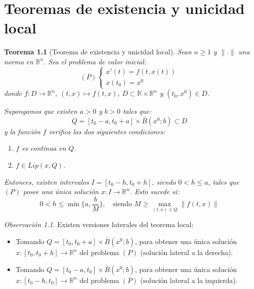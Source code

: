 \documentclass{report}
\newtheorem{theorem}{Teorema}[chapter]
\theoremstyle{remark}
\newtheorem*{remark}{Observación}
\theoremstyle{remark}
\theoremstyle{remark}
\theoremstyle{definition}
\theoremstyle{definition}
\theoremstyle{definition}
\begin{document}
\chapter{Teoremas de existencia y unicidad local}
\begin{theorem}[Teorema de existencia y unicidad local]
    Sean $n \geq 1$ y $\|.\|$ una norma en $\mathbb{R}^n$.
    Sea el problema de valor inicial:
    $$(P) \begin{cases}
            x'(t) = f(t, x(t)) \\
            x(t_0) = x^0
        \end{cases}$$
    donde $f: D \to \mathbb{R}^n$, $(t, x) \mapsto f(t, x)$, $D \subset \mathbb{R} \times \mathbb{R}^n$ y $(t_0, x^0) \in D$.

    Supongamos que existen $a > 0$ y $b > 0$ tales que:
    $$Q = [t_0 - a, t_0 + a] \times \bar{B}(x^0; b) \subset D$$
    y la función $f$ verifica las dos siguientes condiciones:
    \begin{enumerate}
        \item $f$ es continua en $Q$.
        \item $f \in Lip(x, Q)$.
    \end{enumerate}
    Entonces, existen intervalos $I = [t_0 - h, t_0 + h]$, siendo $0 < h \leq a$, tales que $(P)$ posee una única solución $x: I \to \mathbb{R}^n$.
    Esto sucede si:
    $$0 < h \leq \min\{a, \frac{b}{M}\}, \quad \text{siendo } M \geq \max_{(t, x) \in Q} \|f(t, x)\|$$
\end{theorem}

\begin{remark}
    Existen versiones laterales del teorema local:
    \begin{itemize}
        \item Tomando $Q = [t_0, t_0 + a] \times \bar{B}(x^0; b)$, para obtener una única solución $x: [t_0, t_0 + h] \to \mathbb{R}^n$ del problema $(P)$ (solución lateral a la derecha).
        \item Tomando $Q = [t_0 - a, t_0] \times \bar{B}(x^0; b)$, para obtener una única solución $x: [t_0 - h, t_0] \to \mathbb{R}^n$ del problema $(P)$ (solución lateral a la izquierda).
    \end{itemize}
\end{remark}
\end{document}
